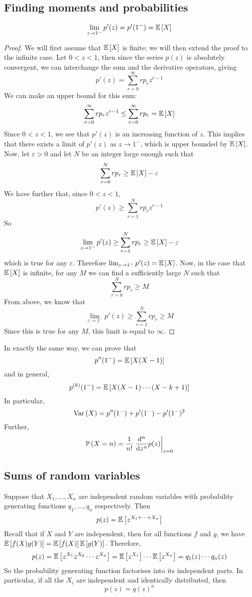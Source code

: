 \subsection{Finding moments and probabilities}
\begin{theorem}
	\[
		\lim_{z \to 1^-} p'(z) = p'(1^-) = \mathbb{E}\left[{X}\right]
	\]
\end{theorem}
\begin{proof}
	We will first assume that \(\mathbb{E}\left[{X}\right]\) is finite; we will then extend the proof to the infinite case.
	Let \(0 < z < 1\), then since the series \(p(z)\) is absolutely convergent, we can interchange the sum and the derivative operators, giving
	\[
		p'(z) = \sum_{r=0}^\infty r p_r z^{r-1}
	\]
	We can make an upper bound for this sum:
	\[
		\sum_{r=0}^\infty r p_r z^{r-1} \leq \sum_{r=0}^\infty r p_r = \mathbb{E}\left[{X}\right]
	\]
	Since \(0 < z < 1\), we see that \(p'(z)\) is an increasing function of \(z\).
	This implies that there exists a limit of \(p'(z)\) as \(z \to 1^-\), which is upper bounded by \(\mathbb{E}\left[{X}\right]\).
	Now, let \(\varepsilon > 0\) and let \(N\) be an integer large enough such that
	\[
		\sum_{r = 0}^N rp_r \geq \mathbb{E}\left[{X}\right] - \varepsilon
	\]
	We have further that, since \(0 < z < 1\),
	\[
		p'(z) \geq \sum_{r=1}^N rp_r z^{r-1}
	\]
	So
	\[
		\lim_{z \to 1^-} p'(z) \geq \sum_{r=1}^N rp_r \geq \mathbb{E}\left[{X}\right] - \varepsilon
	\]
	which is true for any \(\varepsilon\).
	Therefore \(\lim_{z \to 1^-} p'(z) = \mathbb{E}\left[{X}\right]\).
	Now, in the case that \(\mathbb{E}\left[{X}\right]\) is infinite, for any \(M\) we can find a sufficiently large \(N\) such that
	\[
		\sum_{r = 0}^N rp_r \geq M
	\]
	From above, we know that
	\[
		\lim_{z \to 1^-} p'(z) \geq \sum_{r=1}^N rp_r \geq M
	\]
	Since this is true for any \(M\), this limit is equal to \(\infty\).
\end{proof}
In exactly the same way, we can prove that
\[
	p''(1^-) = \mathbb{E}\left[{X(X-1)}\right]
\]
and in general,
\[
	p^{(k)}(1^-) = \mathbb{E}\left[{X(X-1)\cdots(X-k+1)}\right]
\]
In particular,
\[
	\operatorname{Var}\left({X}\right) = p''(1^-) + p'(1^-) - p'(1^-)^2
\]
Further,
\[
	\prob{X = n} = \frac{1}{n!} \eval{\dv[n]{z} p(z)}_{z = 0}
\]

\subsection{Sums of random variables}
Suppose that \(X_1, \dots, X_n\) are independent random variables with probability generating functions \(q_1, \dots, q_n\) respectively.
Then
\[
	p(z) = \mathbb{E}\left[{z^{X_1 + \dots + X_n}}\right]
\]
Recall that if \(X\) and \(Y\) are independent, then for all functions \(f\) and \(g\), we have \(\mathbb{E}\left[{f(X)g(Y)}\right] = \mathbb{E}\left[{f(X)}\right]\mathbb{E}\left[{g(Y)}\right]\).
Therefore,
\[
	p(z) = \mathbb{E}\left[{z^{X_1} z^{X_2} \cdots z^{X_n}}\right] = \mathbb{E}\left[{z^{X_1}}\right] \cdots \mathbb{E}\left[{z^{X_n}}\right] = q_1(z) \cdots q_n(z)
\]
So the probability generating function factorises into its independent parts.
In particular, if all the \(X_i\) are independent and identically distributed, then
\[
	p(z) = q(z)^n
\]


